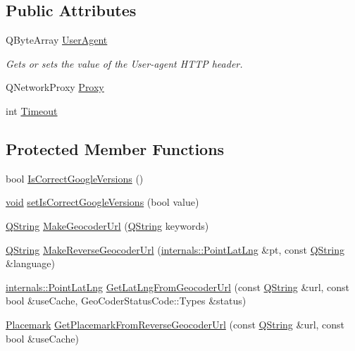 \subsection*{\-Public \-Attributes}
\begin{DoxyCompactItemize}
\item 
\-Q\-Byte\-Array \hyperlink{group___o_p_map_widget_ga9dbf3d049cf1947db76a0c87dd0821fc}{\-User\-Agent}
\begin{DoxyCompactList}\small\item\em \-Gets or sets the value of the \-User-\/agent \-H\-T\-T\-P header. \end{DoxyCompactList}\item 
\-Q\-Network\-Proxy \hyperlink{group___o_p_map_widget_ga4851a6205d1885048a3417f736ec8679}{\-Proxy}
\item 
int \hyperlink{group___o_p_map_widget_gaee21c04663fde2b41c6d471456dc7325}{\-Timeout}
\end{DoxyCompactItemize}
\subsection*{\-Protected \-Member \-Functions}
\begin{DoxyCompactItemize}
\item 
bool \hyperlink{group___o_p_map_widget_ga5ccccf5ffb4b44422b6ca9596d0972f9}{\-Is\-Correct\-Google\-Versions} ()
\item 
\hyperlink{group___u_a_v_objects_plugin_ga444cf2ff3f0ecbe028adce838d373f5c}{void} \hyperlink{group___o_p_map_widget_ga7770edaf0b058ba1317da2a627219fb1}{set\-Is\-Correct\-Google\-Versions} (bool value)
\item 
\hyperlink{group___u_a_v_objects_plugin_gab9d252f49c333c94a72f97ce3105a32d}{\-Q\-String} \hyperlink{group___o_p_map_widget_ga972a8b02da4bbabc676cf8c0aecff2da}{\-Make\-Geocoder\-Url} (\hyperlink{group___u_a_v_objects_plugin_gab9d252f49c333c94a72f97ce3105a32d}{\-Q\-String} keywords)
\item 
\hyperlink{group___u_a_v_objects_plugin_gab9d252f49c333c94a72f97ce3105a32d}{\-Q\-String} \hyperlink{group___o_p_map_widget_gad12026ac0e1b17ce9cdbd8da9b4521db}{\-Make\-Reverse\-Geocoder\-Url} (\hyperlink{structinternals_1_1_point_lat_lng}{internals\-::\-Point\-Lat\-Lng} \&pt, const \hyperlink{group___u_a_v_objects_plugin_gab9d252f49c333c94a72f97ce3105a32d}{\-Q\-String} \&language)
\item 
\hyperlink{structinternals_1_1_point_lat_lng}{internals\-::\-Point\-Lat\-Lng} \hyperlink{group___o_p_map_widget_ga5fcebca86495c19cd0feda82e7bb756d}{\-Get\-Lat\-Lng\-From\-Geocoder\-Url} (const \hyperlink{group___u_a_v_objects_plugin_gab9d252f49c333c94a72f97ce3105a32d}{\-Q\-String} \&url, const bool \&use\-Cache, \-Geo\-Coder\-Status\-Code\-::\-Types \&status)
\item 
\hyperlink{classcore_1_1_placemark}{\-Placemark} \hyperlink{group___o_p_map_widget_ga6f4535cb1c90494c811786af2dbac194}{\-Get\-Placemark\-From\-Reverse\-Geocoder\-Url} (const \hyperlink{group___u_a_v_objects_plugin_gab9d252f49c333c94a72f97ce3105a32d}{\-Q\-String} \&url, const bool \&use\-Cache)
\end{DoxyCompactItemize}
